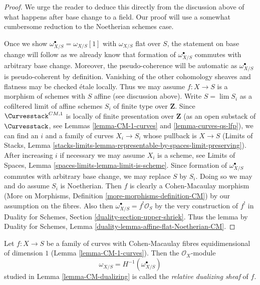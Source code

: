 \begin{proof}
We urge the reader to deduce this directly from the discussion above
of what happens after base change to a field. Our proof will
use a somewhat cumbersome reduction to the Noetherian schemes case.

\medskip\noindent
Once we show $\omega_{X/S}^\bullet = \omega_{X/S}[1]$ with
$\omega_{X/S}$ flat over $S$, the statement on base change
will follow as we already know that formation of $\omega_{X/S}^\bullet$
commutes with arbitrary base change. Moreover, the pseudo-coherence
will be automatic as $\omega_{X/S}^\bullet$ is pseudo-coherent
by definition. Vanishing of the other cohomology sheaves and flatness 
may be checked \'etale locally. Thus we may assume $f : X \to S$
is a morphism of schemes with $S$ affine (see discussion above).
Write $S = \lim S_i$ as a cofiltered limit of affine schemes $S_i$
of finite type over $\mathbf{Z}$.
Since $\Curvesstack^{CM, 1}$ is locally of finite presentation over
$\mathbf{Z}$ (as an open substack of $\Curvesstack$, see
Lemmas \ref{lemma-CM-1-curves} and \ref{lemma-curves-qs-lfp}),
we can find an $i$ and a family
of curves $X_i \to S_i$ whose pullback is $X \to S$
(Limits of Stacks, Lemma
\ref{stacks-limits-lemma-representable-by-spaces-limit-preserving}).
After increasing $i$ if necessary we may assume $X_i$ is a scheme,
see Limits of Spaces, Lemma \ref{spaces-limits-lemma-limit-is-scheme}.
Since formation of $\omega_{X/S}^\bullet$ commutes with
arbitrary base change, we may replace $S$ by $S_i$.
Doing so we may and do assume $S_i$ is Noetherian.
Then $f$ is clearly a Cohen-Macaulay morphism
(More on Morphisms, Definition \ref{more-morphisms-definition-CM})
by our assumption on the fibres.
Also then $\omega_{X/S}^\bullet = f^!\mathcal{O}_S$
by the very construction of $f^!$ in
Duality for Schemes, Section \ref{duality-section-upper-shriek}.
Thus the lemma by Duality for Schemes, Lemma
\ref{duality-lemma-affine-flat-Noetherian-CM}.
\end{proof}

\begin{definition}
\label{definition-relative-dualizing-sheaf}
Let $f : X \to S$ be a family of curves with Cohen-Macaulay fibres
equidimensional of dimension $1$ (Lemma \ref{lemma-CM-1-curves}).
Then the $\mathcal{O}_X$-module
$$
\omega_{X/S} = H^{-1}(\omega_{X/S}^\bullet)
$$
studied in Lemma \ref{lemma-CM-dualizing}
is called the {\it relative dualizing sheaf} of $f$.
\end{definition}

